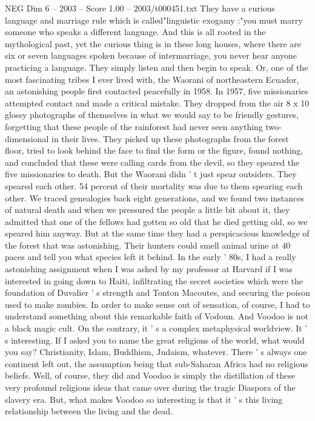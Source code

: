 \begin{textsample}{NEG Dim 6 – 2003 – Score 1.00 – 2003/t000451.txt}
They have a curious language and marriage rule which is called"linguistic exogamy :"you must marry someone who speaks a different language.
And this is all rooted in the mythological past, yet the curious thing is in these long houses, where there are six or seven languages spoken because of intermarriage, you never hear anyone practicing a language.
They simply listen and then begin to speak.
Or, one of the most fascinating tribes I ever lived with, the Waorani of northeastern Ecuador, an astonishing people first contacted peacefully in 1958.
In 1957, five missionaries attempted contact and made a critical mistake.
They dropped from the air 8 x 10 glossy photographs of themselves in what we would say to be friendly gestures, forgetting that these people of the rainforest had never seen anything two-dimensional in their lives.
They picked up these photographs from the forest floor, tried to look behind the face to find the form or the figure, found nothing, and concluded that these were calling cards from the devil, so they speared the five missionaries to death.
But the Waorani didn ' t just spear outsiders.
They speared each other. 54 percent of their mortality was due to them spearing each other.
We traced genealogies back eight generations, and we found two instances of natural death and when we pressured the people a little bit about it, they admitted that one of the fellows had gotten so old that he died getting old, so we speared him anyway.
But at the same time they had a perspicacious knowledge of the forest that was astonishing.
Their hunters could smell animal urine at 40 paces and tell you what species left it behind.
In the early ' 80s, I had a really astonishing assignment when I was asked by my professor at Harvard if I was interested in going down to Haiti, infiltrating the secret societies which were the foundation of Duvalier ' s strength and Tonton Macoutes, and securing the poison used to make zombies.
In order to make sense out of sensation, of course, I had to understand something about this remarkable faith of Vodoun.
And Voodoo is not a black magic cult.
On the contrary, it ' s a complex metaphysical worldview.
It ' s interesting.
If I asked you to name the great religions of the world, what would you say?
Christianity, Islam, Buddhism, Judaism, whatever.
There ' s always one continent left out, the assumption being that sub-Saharan Africa had no religious beliefs.
Well, of course, they did and Voodoo is simply the distillation of these very profound religious ideas that came over during the tragic Diaspora of the slavery era.
But, what makes Voodoo so interesting is that it ' s this living relationship between the living and the dead.

\end{textsample}
